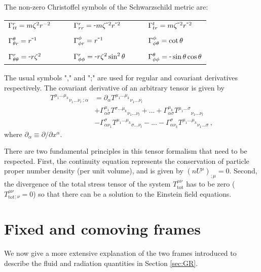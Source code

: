 \documentclass[../main.tex]{subfiles}
\begin{document}
The non-zero Christoffel symbols of the Schwarzschild metric are: 
\begin{center}
    \begin{tabular}{lll}
        $\Gamma^{r}_{tt}=m\zeta^2r^{-2}$ & $\qquad\chris{r}{r}{r}=\-m\zeta^{\-2}r^{\-2}\qquad$ & $\chris{t}{t}{r}=m\zeta^{\-2}r^{\-2}$  \\
        \\
        $\chris{\theta}{\theta}{r}=r^{\-1}$ & $\qquad\chris{\phi}{\phi}{r}=r^{\-1}\qquad$ & $\Gamma^{\phi}_{\phi\theta}=\cot\theta$ \\
        \\
        $\chris{r}{\theta}{\theta}=\-r\zeta^2$ & $\qquad\chris{r}{\phi}{\phi}=\-r\zeta^2\sin^2\theta\qquad$ & $\chris{\theta}{\phi}{\phi}=\-\sin\theta\cos\theta$  \\
    \end{tabular}
\end{center}

The usual symbols "," and ";" are used for regular and covariant derivatives respectively.  The covariant derivative of an arbitrary tensor is given by 
\begin{align}
T^{\mu_1...\mu_k}{}_{\nu_1...\nu_l\; ;\alpha}&=\partial_\alpha T^{\mu_1...\mu_k}{}_{\nu_1...\nu_l}\nonumber\\
&+\Gamma^{\mu_1}_{\alpha \sigma}T^{\sigma...\mu_k}{}_{\nu_1...\nu_l}+...+\Gamma^{\mu_k}_{\alpha \sigma}T^{\mu_1...\sigma}{}_{\nu_1...\nu_l}\nonumber\\
&-\Gamma^{\sigma}_{\alpha \nu_1}T^{\mu_1...\mu_k}{}_{\sigma...\nu_l}-...-\Gamma^{\sigma}_{\alpha \nu_k}T^{\mu_1...\mu_k}{}_{\nu_1...\sigma}\,,\label{eq::tensor_divergence}
\end{align}
where $\partial_\alpha\equiv\partial/\partial x^\alpha$.

There are two fundamental principles in this tensor formalism that need to be respected. First, the continuity equation represents the conservation of particle proper number density (per unit volume), and is given by $(nU^\mu)_{;\mu}=0$.   Second, the divergence of the total stress tensor of the system $T^{\mu\nu}_\text{tot}$ has to be zero ($T^{\mu\nu}_\text{tot}{}_{;\nu}=0$) so that there can be a solution to the Einstein field equations.  

\section*{Fixed and comoving frames}
We now give a more extensive explanation of the two frames introduced to describe the fluid and radiation quantities in Section \ref{sec:GR}.
\end{document}
